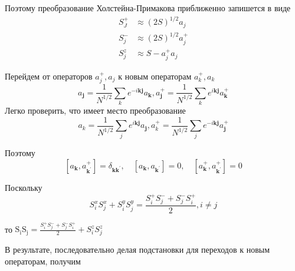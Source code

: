 \documentclass[a4paper,12pt]{article} %
\begin{document}
\begin{ttask}
Поэтому преобразование Холстейна-Примакова приближенно запишется в виде
$$
\begin{aligned}
	S_{J}^{+} & \approx(2 S)^{1 / 2} a_{j} 
	\\
	S_{j}^{-} & \approx(2 S)^{1 / 2} a_{j}^{+} 
	\\
	S_{j}^{z} & \approx S-a_{j}^{+} a_{j}
\end{aligned}
$$



Перейдем от операторов $a_{j}^{+}, a_{j}$ к новым операторам $a_{k}^{+}, a_{k}$
$$
a_{\mathbf{j}}=\frac{1}{N^{1 / 2}} \sum_{k} e^{-i \mathbf{k} \mathbf{j}} a_{\mathbf{k}}, a_{\mathbf{j}}^{+}=\frac{1}{N^{1 / 2}} \sum_{k} e^{i \mathbf{k} \mathbf{j}} a_{\mathbf{k}}^{+}
$$
Легко проверить, что имеет место преобразование
$$
a_{k}
=
\frac{1}{N^{1 / 2}} 
\sum_{j} e^{i \mathbf{k} \mathbf{j}} a_{\mathbf{j}}, a_{k}^{+}
=
\frac{1}{N^{1 / 2}} 
\sum_{j} e^{-i \mathbf{k} \mathbf{j}} a_{\mathbf{j}}^{+}
$$


Поэтому
$$
\left[a_{\mathbf{k}}, a_{\mathbf{k}^{\prime}}^{+}\right]=\delta_{\mathbf{k k}^{\prime}},
\quad
\left[a_{\mathbf{k}}, a_{\mathbf{k}^{\prime}}\right]=0,
\quad
\left[a_{\mathbf{k}}^{+}, a_{\mathbf{k}^{\prime}}^{+}\right]=0
$$



Поскольку
$$
S_{i}^{x} S_{j}^{x}+S_{i}^{y} S_{j}^{y}
=
\frac{S_{i}^{+} S_{j}^{-}+S_{j}^{-} S_{i}^{+}}{2}, i \neq j
$$

то
$\mathrm{S}_{\mathrm{i}} \mathrm{S}_{\mathrm{j}}
=
\frac{S_{i}^{+} S_{j}^{-}+S_{j}^{-} S_{i}^{+}}{2}
+
S_{i}^{z} S_{j}^{z}$


В результате, последовательно делая подстановки 
для переходов к новым операторам, получим


\end{ttask}
\end{document}
